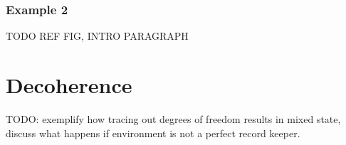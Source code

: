 \subsection{Example 2}

TODO REF FIG, INTRO PARAGRAPH



\chapter{Decoherence}
TODO: exemplify how tracing out degrees of freedom results in mixed state, discuss what happens if environment is not a perfect record keeper.
%
%
%
%
%
%
%
%
